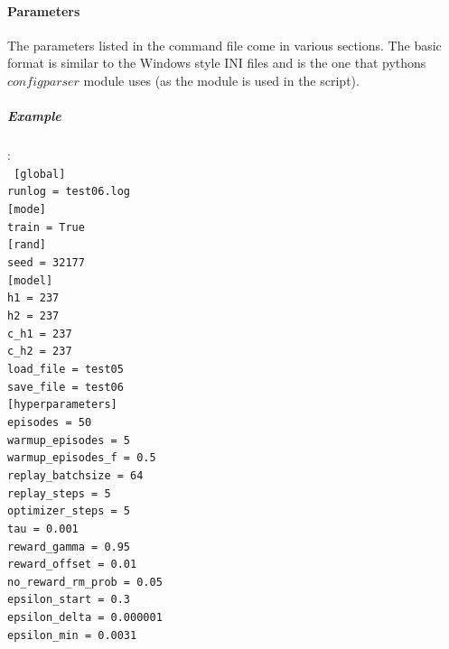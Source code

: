 \documentclass[a4paper]{article}
\begin{document}
\paragraph{Parameters}
The parameters listed in the command file come in various sections. The basic format
is similar to the Windows style INI files and is the one that pythons $configparser$
module uses (as the module is used in the script).

\subparagraph{Example}
:\\
\tiny
\texttt{
{[global]} \\
runlog = test06.log \\
{[mode]} \\
train = True \\
{[rand]} \\
seed = 32177 \\
{[model]} \\
h1 = 237 \\
h2 = 237 \\
c\_h1 = 237 \\
c\_h2 = 237 \\
load\_file = test05 \\
save\_file = test06 \\
{[hyperparameters]} \\
episodes           = 50 \\
warmup\_episodes    = 5 \\
warmup\_episodes\_f  = 0.5 \\
replay\_batchsize   = 64 \\
replay\_steps       = 5 \\
optimizer\_steps    = 5 \\
tau                = 0.001 \\
reward\_gamma       = 0.95 \\
reward\_offset      = 0.01 \\
no\_reward\_rm\_prob  = 0.05 \\
epsilon\_start      = 0.3 \\
epsilon\_delta      = 0.000001 \\
epsilon\_min        = 0.0031
}

\normalsize
\end{document}
